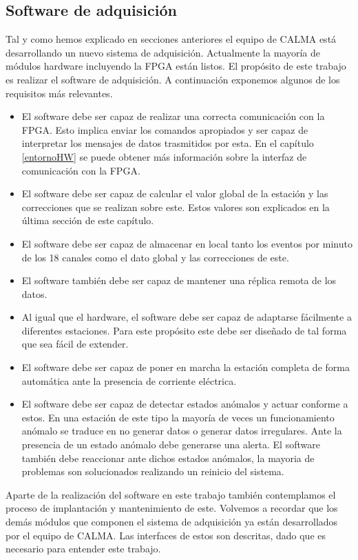 	\subsection{Software de adquisición}
		Tal y como hemos explicado en secciones anteriores el equipo de CALMA está desarrollando un nuevo sistema de adquisición. Actualmente
		la mayoría de módulos hardware incluyendo la FPGA están listos. El propósito de este trabajo es realizar el software de adquisición. A
		continuación exponemos algunos de los requisitos más relevantes.
		\begin{itemize}
			\item 	El software debe ser capaz de realizar una correcta comunicación con la FPGA. Esto implica enviar los comandos
				apropiados y ser capaz de interpretar los mensajes de datos trasmitidos por esta. En el capítulo \ref{entornoHW} se
				puede obtener más información sobre la interfaz de comunicación con la FPGA.
			\item 	El software debe ser capaz de calcular el valor global de la estación y las correcciones que se realizan sobre este.
			  	Estos valores son explicados en la última sección de este capítulo.
			\item	El software debe ser capaz de almacenar en local tanto los eventos por minuto de los 18 canales como el dato global y
			  	las correcciones de este.
			\item 	El software también debe ser capaz de mantener una réplica remota de los datos.
			\item 	Al igual que el hardware, el software debe ser capaz de adaptarse fácilmente a diferentes estaciones. Para este
				propósito este debe ser diseñado de tal forma que sea fácil de extender.
			\item 	El software debe ser capaz de poner en marcha la estación completa de forma automática ante la presencia de corriente
			  	eléctrica. 
			\item 	El software debe ser capaz de detectar estados anómalos y actuar conforme a estos. En una estación de este tipo la
				mayoría de veces un funcionamiento anómalo se traduce en no generar datos o generar datos irregulares. Ante la
				presencia de un estado anómalo debe generarse una alerta. El software también debe reaccionar ante dichos estados
				anómalos, la mayoria de problemas son solucionados realizando un reinicio del sistema.
		\end{itemize}
		Aparte de la realización del software en este trabajo también contemplamos el proceso de implantación y mantenimiento de este.
		Volvemos a recordar que los demás módulos que componen el sistema de adquisición ya están desarrollados por el equipo de CALMA. Las
		interfaces de estos son descritas, dado que es necesario para entender este trabajo.
